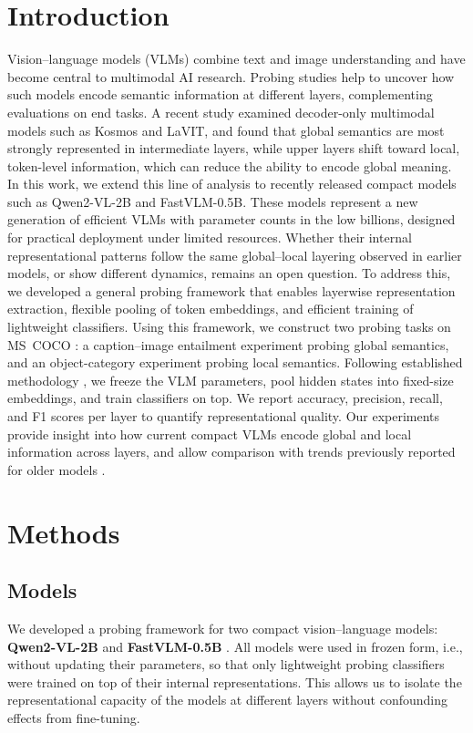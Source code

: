 \documentclass[11pt]{article}
\begin{document}
\section{Introduction}
Vision--language models (VLMs) combine text and image understanding and have become central to multimodal AI research. Probing studies help to uncover how such models encode semantic information at different layers, complementing evaluations on end tasks. A recent study \cite{tao2024probingmultimodallargelanguage} examined decoder-only multimodal models such as Kosmos and LaVIT, and found that global semantics are most strongly represented in intermediate layers, while upper layers shift toward local, token-level information, which can reduce the ability to encode global meaning.
In this work, we extend this line of analysis to recently released compact models such as Qwen2-VL-2B and FastVLM-0.5B. These models represent a new generation of efficient VLMs with parameter counts in the low billions, designed for practical deployment under limited resources. Whether their internal representational patterns follow the same global–local layering observed in earlier models, or show different dynamics, remains an open question.
To address this, we developed a general probing framework \cite{JDev2001_ULM_Probing_VLMs} that enables layerwise representation extraction, flexible pooling of token embeddings, and efficient training of lightweight classifiers. Using this framework, we construct two probing tasks on MS~COCO \cite{lin2014microsoft}: a caption–image entailment experiment probing global semantics, and an object-category experiment probing local semantics. Following established methodology \cite{alain2018understanding}, we freeze the VLM parameters, pool hidden states into fixed-size embeddings, and train classifiers on top. We report accuracy, precision, recall, and F1 scores per layer to quantify representational quality.
Our experiments provide insight into how current compact VLMs encode global and local information across layers, and allow comparison with trends previously reported for older models \cite{tao2024probingmultimodallargelanguage}.

\section{Methods}

\subsection{Models}
We developed a probing framework for two compact vision--language models:
\textbf{Qwen2-VL-2B} \cite{qwen2vl2024} and \textbf{FastVLM-0.5B} \cite{fastvlm2025}.
All models were used in frozen form, i.e., without updating their parameters,
so that only lightweight probing classifiers were trained on top of their internal
representations. This allows us to isolate the representational capacity of the models
at different layers without confounding effects from fine-tuning.
\end{document}
